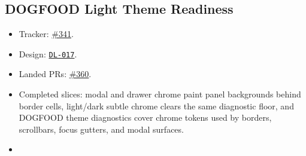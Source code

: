 \subsection{DOGFOOD Light Theme Readiness}\label{record-261-dogfood-light-theme-readiness}

\begin{itemize}
\tightlist
\item
  Tracker: \href{https://github.com/flyingrobots/bijou/issues/341}{\#341}.
\item
  Design: \href{https://github.com/flyingrobots/bijou/blob/cbd70612140e7a450d764b3c7be1c6af878b99bc/docs/design/DL-017-dogfood-light-theme-readiness.md}{\texttt{D\allowbreak{}L\allowbreak{}-\allowbreak{}0\allowbreak{}1\allowbreak{}7}}.
\item
  Landed PRs: \href{https://github.com/flyingrobots/bijou/pull/360}{\#360}.
\item
  Completed slices: modal and drawer chrome paint panel backgrounds behind border cells, light/dark subtle chrome clears the same diagnostic floor, and DOGFOOD theme diagnostics cover chrome tokens used by borders, scrollbars, focus gutters, and modal surfaces.
\item

\end{itemize}
